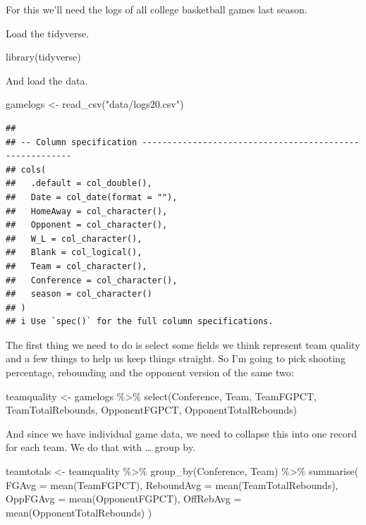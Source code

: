 \documentclass[
]{book}
\newenvironment{Shaded}{\begin{snugshade}}{\end{snugshade}}
\newcommand{\AttributeTok}[1]{\textcolor[rgb]{0.77,0.63,0.00}{#1}}
\newcommand{\FunctionTok}[1]{\textcolor[rgb]{0.00,0.00,0.00}{#1}}
\newcommand{\NormalTok}[1]{#1}
\newcommand{\OtherTok}[1]{\textcolor[rgb]{0.56,0.35,0.01}{#1}}
\newcommand{\SpecialCharTok}[1]{\textcolor[rgb]{0.00,0.00,0.00}{#1}}
\newcommand{\StringTok}[1]{\textcolor[rgb]{0.31,0.60,0.02}{#1}}
\begin{document}
For this we'll need the logs of all college basketball games last season.

Load the tidyverse.

\begin{Shaded}
\begin{Highlighting}[]
\FunctionTok{library}\NormalTok{(tidyverse)}
\end{Highlighting}
\end{Shaded}

And load the data.

\begin{Shaded}
\begin{Highlighting}[]
\NormalTok{gamelogs }\OtherTok{\textless{}{-}} \FunctionTok{read\_csv}\NormalTok{(}\StringTok{"data/logs20.csv"}\NormalTok{)}
\end{Highlighting}
\end{Shaded}

\begin{verbatim}
## 
## -- Column specification --------------------------------------------------------
## cols(
##   .default = col_double(),
##   Date = col_date(format = ""),
##   HomeAway = col_character(),
##   Opponent = col_character(),
##   W_L = col_character(),
##   Blank = col_logical(),
##   Team = col_character(),
##   Conference = col_character(),
##   season = col_character()
## )
## i Use `spec()` for the full column specifications.
\end{verbatim}

The first thing we need to do is select some fields we think represent team quality and a few things to help us keep things straight. So I'm going to pick shooting percentage, rebounding and the opponent version of the same two:

\begin{Shaded}
\begin{Highlighting}[]
\NormalTok{teamquality }\OtherTok{\textless{}{-}}\NormalTok{ gamelogs }\SpecialCharTok{\%\textgreater{}\%} 
  \FunctionTok{select}\NormalTok{(Conference, Team, TeamFGPCT, TeamTotalRebounds, OpponentFGPCT, OpponentTotalRebounds)}
\end{Highlighting}
\end{Shaded}

And since we have individual game data, we need to collapse this into one record for each team. We do that with \ldots{} group by.

\begin{Shaded}
\begin{Highlighting}[]
\NormalTok{teamtotals }\OtherTok{\textless{}{-}}\NormalTok{ teamquality }\SpecialCharTok{\%\textgreater{}\%} 
  \FunctionTok{group\_by}\NormalTok{(Conference, Team) }\SpecialCharTok{\%\textgreater{}\%} 
  \FunctionTok{summarise}\NormalTok{(}
    \AttributeTok{FGAvg =} \FunctionTok{mean}\NormalTok{(TeamFGPCT), }
    \AttributeTok{ReboundAvg =} \FunctionTok{mean}\NormalTok{(TeamTotalRebounds), }
    \AttributeTok{OppFGAvg =} \FunctionTok{mean}\NormalTok{(OpponentFGPCT),}
    \AttributeTok{OffRebAvg =} \FunctionTok{mean}\NormalTok{(OpponentTotalRebounds)}
\NormalTok{    ) }
\end{Highlighting}
\end{Shaded}
\end{document}
